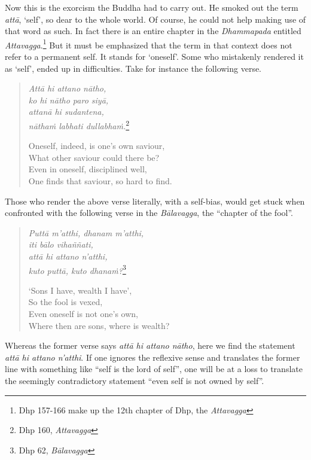 Now this is the exorcism the Buddha had to carry out. He smoked out the term \emph{attā}, `self', so dear to the whole world. Of course, he could not help making use of that word as such. In fact there is an entire chapter in the \emph{Dhammapada} entitled \emph{Attavagga}.\footnote{Dhp 157-166 make up the 12th chapter of Dhp, the \emph{Attavagga}} But it must be emphasized that the term in that context does not refer to a permanent self. It stands for `oneself'. Some who mistakenly rendered it as `self', ended up in difficulties. Take for instance the following verse.

\begin{quote}
\emph{Attā hi attano nātho,}\\
\emph{ko hi nātho paro siyā,}\\
\emph{attanā hi sudantena,}\\
\emph{nāthaṁ labhati dullabhaṁ.}\footnote{Dhp 160, \emph{Attavagga}}

Oneself, indeed, is one's own saviour,\\
What other saviour could there be?\\
Even in oneself, disciplined well,\\
One finds that saviour, so hard to find.
\end{quote}

Those who render the above verse literally, with a self-bias, would get stuck when confronted with the following verse in the \emph{Bālavagga}, the ``chapter of the fool''.

\begin{quote}
\emph{Puttā m'atthi, dhanam m'atthi,}\\
\emph{iti bālo vihaññati,}\\
\emph{attā hi attano n'atthi,}\\
\emph{kuto puttā, kuto dhanaṁ?}\footnote{Dhp 62, \emph{Bālavagga}}

`Sons I have, wealth I have',\\
So the fool is vexed,\\
Even oneself is not one's own,\\
Where then are sons, where is wealth?
\end{quote}

Whereas the former verse says \emph{attā hi attano nātho}, here we find the statement \emph{attā hi attano n'atthi}. If one ignores the reflexive sense and translates the former line with something like ``self is the lord of self'', one will be at a loss to translate the seemingly contradictory statement ``even self is not owned by self''.

